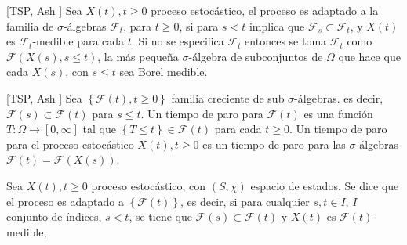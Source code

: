 \begin{Def}\label{Def.Proc.Adaptado}[TSP, Ash \cite{RBA}]
Sea $X\left(t\right),t\geq0$ proceso estoc\'astico, el proceso es
adaptado a la familia de $\sigma$-\'algebras $\mathcal{F}_{t}$,
para $t\geq0$, si para $s<t$ implica que
$\mathcal{F}_{s}\subset\mathcal{F}_{t}$, y $X\left(t\right)$ es
$\mathcal{F}_{t}$-medible para cada $t$. Si no se especifica
$\mathcal{F}_{t}$ entonces se toma $\mathcal{F}_{t}$ como
$\mathcal{F}\left(X\left(s\right),s\leq t\right)$, la m\'as
peque\~na $\sigma$-\'algebra de subconjuntos de $\Omega$ que hace
que cada $X\left(s\right)$, con $s\leq t$ sea Borel medible.
\end{Def}


\begin{Def}\label{Def.Tiempo.Paro}[TSP, Ash \cite{RBA}]
Sea $\left\{\mathcal{F}\left(t\right),t\geq0\right\}$ familia
creciente de sub $\sigma$-\'algebras. es decir,
$\mathcal{F}\left(s\right)\subset\mathcal{F}\left(t\right)$ para
$s\leq t$. Un tiempo de paro para $\mathcal{F}\left(t\right)$ es
una funci\'on $T:\Omega\rightarrow\left[0,\infty\right]$ tal que
$\left\{T\leq t\right\}\in\mathcal{F}\left(t\right)$ para cada
$t\geq0$. Un tiempo de paro para el proceso estoc\'astico
$X\left(t\right),t\geq0$ es un tiempo de paro para las
$\sigma$-\'algebras
$\mathcal{F}\left(t\right)=\mathcal{F}\left(X\left(s\right)\right)$.
\end{Def}

\begin{Def}
Sea $X\left(t\right),t\geq0$ proceso estoc\'astico, con
$\left(S,\chi\right)$ espacio de estados. Se dice que el proceso
es adaptado a $\left\{\mathcal{F}\left(t\right)\right\}$, es
decir, si para cualquier $s,t\in I$, $I$ conjunto de \'indices,
$s<t$, se tiene que
$\mathcal{F}\left(s\right)\subset\mathcal{F}\left(t\right)$ y
$X\left(t\right)$ es $\mathcal{F}\left(t\right)$-medible,
\end{Def}


